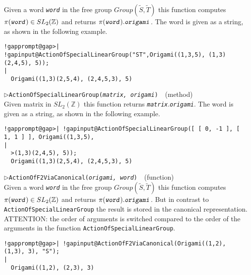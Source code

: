 \documentclass[a4paper,11pt]{report}
\begin{document}
{{{ Given a word \mbox{\texttt{\mdseries\slshape word}} in the free group $Group(\tilde{S}, \tilde{T})$ this function computes $\pi(\mbox{\texttt{\mdseries\slshape word}}) \in SL_2(\mathbb{Z})$ and returns $\pi(\mbox{\texttt{\mdseries\slshape word}}).\mbox{\texttt{\mdseries\slshape origami}}$. The word is given as a string, as shown in the following example. 
\begin{Verbatim}[commandchars=!@|,fontsize=\small,frame=single,label=Example]
  !gapprompt@gap>| !gapinput@ActionOfSpecialLinearGroup("ST",Origami((1,3,5), (1,3)(2,4,5), 5));
|
  Origami((1,3)(2,5,4), (2,4,5,3), 5)
\end{Verbatim}
 \noindent\textcolor{FuncColor}{$\triangleright$\enspace\texttt{ActionOfSpecialLinearGroup({\mdseries\slshape matrix, origami})
\label{ActionOfSpecialLinearGroup}
}\hfill{\scriptsize (method)}}\\


 Given matrix in $SL_2(\mathbb{Z}) $ this function returns \mbox{\texttt{\mdseries\slshape matrix}}.\mbox{\texttt{\mdseries\slshape origami}}. The word is given as a string, as shown in the following example. 
\begin{Verbatim}[commandchars=!@|,fontsize=\small,frame=single,label=Example]
  !gapprompt@gap>| !gapinput@ActionOfSpecialLinearGroup([ [ 0, -1 ], [ 1, 1 ] ], Origami((1,3,5), 
|
  >(1,3)(2,4,5), 5)); 
  Origami((1,3)(2,5,4), (2,4,5,3), 5)
\end{Verbatim}
 \noindent\textcolor{FuncColor}{$\triangleright$\enspace\texttt{ActionOfF2ViaCanonical({\mdseries\slshape origami, word})
\label{ActionOfF2ViaCanonical}
}\hfill{\scriptsize (function)}}\\


 Given a word \mbox{\texttt{\mdseries\slshape word}} in the free group $Group(\tilde{S}, \tilde{T})$ this function computes $\pi(\mbox{\texttt{\mdseries\slshape word}}) \in SL_2(\mathbb{Z})$ and returns $\pi(\mbox{\texttt{\mdseries\slshape word}}).\mbox{\texttt{\mdseries\slshape origami}}$. But in contrast to \texttt{ActionOfSpecialLinearGroup} the result is stored in the canonical representation. ATTENTION: the order of
arguments is switched compared to the order of the arguments in the function \texttt{ActionOfSpecialLinearGroup}. 
\begin{Verbatim}[commandchars=!@|,fontsize=\small,frame=single,label=Example]
  !gapprompt@gap>| !gapinput@ActionOfF2ViaCanonical(Origami((1,2), (1,3), 3), "S");
|
  Origami((1,2), (2,3), 3)
    

\end{Verbatim}}}}
\end{document}
